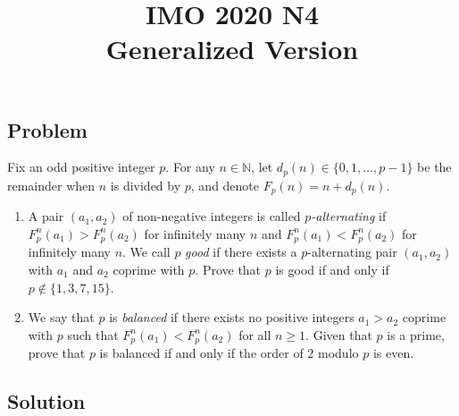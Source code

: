 \documentclass{article}
\title{IMO 2020 N4 \\ Generalized Version}
\date{}
\author{}
\newcommand{\N}{\mathbb{N}}
\begin{document}
\maketitle



\subsection*{Problem}

Fix an odd positive integer $p$.
For any $n \in \N$, let $d_p(n) \in \{0, 1, \ldots, p - 1\}$ be the remainder when $n$ is divided by $p$, and denote $F_p(n) = n + d_p(n)$.

\begin{enumerate}

\item
A pair $(a_1, a_2)$ of non-negative integers is called \emph{$p$-alternating} if $F_p^n(a_1) > F_p^n(a_2)$ for infinitely many $n$ and $F_p^n(a_1) < F_p^n(a_2)$ for infinitely many $n$.
We call $p$ \emph{good} if there exists a $p$-alternating pair $(a_1, a_2)$ with $a_1$ and $a_2$ coprime with $p$.
Prove that $p$ is good if and only if $p \notin \{1, 3, 7, 15\}$.

\item
We say that $p$ is \emph{balanced} if there exists no positive integers $a_1 > a_2$ coprime with $p$ such that $F_p^n(a_1) < F_p^n(a_2)$ for all $n \geq 1$.
Given that $p$ is a prime, prove that $p$ is balanced if and only if the order of $2$ modulo $p$ is even.

\end{enumerate}



\subsection*{Solution}
\end{document}
